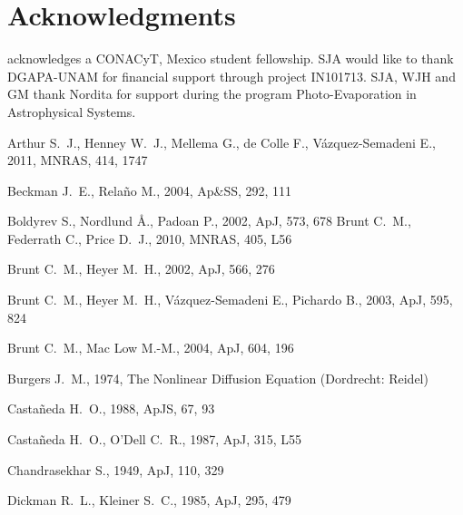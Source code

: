 \documentclass[useAMS,usenatbib]{mn2e}
\providecommand{\DIFadd}[1]{{\protect\color{red!70!black}#1}} %
\providecommand{\DIFdel}[1]{} %
\providecommand{\DIFaddbegin}{\color{red!70!black}} %
\providecommand{\DIFaddend}{\color{black}} %
\providecommand{\DIFdelbegin}{} %
\providecommand{\DIFdelend}{} %
\begin{document}
\section*{Acknowledgments}
\DIFdelbegin \DIFdel{SNSM }\DIFdelend \DIFaddbegin \DIFadd{SNXM }\DIFaddend acknowledges a CONACyT, Mexico student fellowship. SJA would like to thank
DGAPA-UNAM for financial support through project IN101713. SJA, WJH
and GM thank Nordita for support during the program Photo-Evaporation
in Astrophysical Systems.


\begin{thebibliography}{}
Arthur S.~J., Henney W.~J., Mellema G., de Colle F., V{\'a}zquez-Semadeni 
E., 2011, MNRAS, 414, 1747 

 Beckman J.~E., Rela{\~n}o M., 2004, Ap\&SS, 292, 111 

 Boldyrev S., Nordlund {\AA}., Padoan P., 2002, ApJ, 573, 678 
 Brunt C.~M., Federrath C., Price D.~J., 2010, MNRAS, 405, L56 

 Brunt C.~M., Heyer M.~H., 2002, ApJ, 566, 276 

Brunt C.~M., Heyer M.~H., V{\'a}zquez-Semadeni E., Pichardo B., 2003, ApJ, 
595, 824 

 Brunt C.~M., Mac Low M.-M., 2004, ApJ, 604, 196 


 Burgers
  J.~M., 1974, The Nonlinear Diffusion Equation (Dordrecht: Reidel)

Casta\~neda H.~O., 1988, ApJS, 67, 93 

 Casta\~neda H.~O., O'Dell C.~R., 1987, ApJ, 315, L55 

Chandrasekhar S., 1949, ApJ, 110, 329 

 Dickman R.~L., Kleiner S.~C., 1985, ApJ, 295, 479 


\end{thebibliography}
\end{document}
